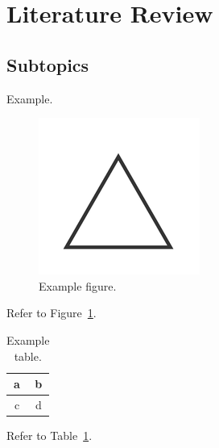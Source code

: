 \section{Literature Review}

\subsection{Subtopics}

Example.

\begin{figure}[H]
	\centering
	\includegraphics{assets/example.png}
	\caption{Example figure.}
	\label{fig:example}
\end{figure}

Refer to Figure~\ref{fig:example}.

\begin{table}[H]
	\centering
	\caption{Example table.}
	\label{tab:example}
	\begin{tabular}{|c|c|}
		\hline
		a & b \\
		\hline
		c & d \\
		\hline
	\end{tabular}
\end{table}

Refer to Table~\ref{tab:example}.
